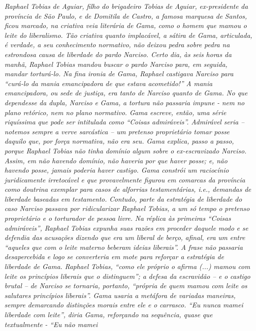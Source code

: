 {\begin{didascalia}
\emph{Raphael Tobias de Aguiar, filho do brigadeiro Tobias de Aguiar,
ex-presidente da província de São Paulo, e de Domitila de Castro, a
famosa marquesa de Santos, ficou marcado, na criativa veia literária de
Gama, como o homem que mamou o leite do liberalismo. Tão criativa quanto
implacável, a sátira de Gama, articulada, é verdade, a seu conhecimento
normativo, não deixou pedra sobre pedra na estrondosa causa de liberdade
do pardo Narciso. Certo dia, às seis horas da manhã, Raphael Tobias
mandou buscar o pardo Narciso para, em seguida, mandar torturá-lo. Na
fina ironia de Gama, Raphael castigava Narciso para ``curá-lo da mania
emancipadora de que estava acometido!'' A mania emancipadora, ou sede de
justiça, era tanto de Narciso quanto de Gama. No que dependesse da
dupla, Narciso e Gama, a tortura não passaria impune - nem no plano
retórico, nem no plano normativo. Gama escreve, então, uma série
riquíssima que pode ser intitulada como ``Coisas admiráveis''. Admirável
seria -- notemos sempre a verve sarcástica -- um pretenso proprietário
tomar posse daquilo que, por força normativa, não era seu. Gama explica,
passo a passo, porque Raphael Tobias não tinha domínio algum sobre o
ex-escravizado Narciso. Assim, em não havendo domínio, não haveria por
que haver posse; e, não havendo posse, jamais poderia haver castigo.
Gama constrói um raciocínio juridicamente irretocável e que
provavelmente figurou em comarcas da província como doutrina exemplar
para casos de alforrias testamentárias, i.e., demandas de liberdade
baseadas em testamento. Contudo, parte da estratégia de liberdade do
caso Narciso passava por ridicularizar Raphael Tobias, a um só tempo o
pretenso proprietário e o torturador de pessoa livre. Na réplica às
primeiras ``Coisas admiráveis'', Raphael Tobias expunha suas razões em
proceder daquele modo e se defendia das acusações dizendo que era um
liberal de berço, afinal, era um entre ``aqueles que com o leite materno
beberam ideias liberais''. A frase não passaria desapercebida e logo se
converteria em mote para reforçar a estratégia de liberdade de Gama.
Raphael Tobias, ``como ele próprio o afirma (...) mamou com leite os
princípios liberais que o distinguem''; a defesa da escravidão -- e o
castigo brutal -- de Narciso se tornaria, portanto, ``própria de quem
mamou com leite os salutares princípios liberais''. Gama usaria a
metáfora de variadas maneiras, sempre demarcando distinções morais entre
ele e o carrasco. ``Eu nunca mamei liberdade com leite'', diria Gama,
reforçando na sequência, quase que textualmente - ``Eu não mamei
}
\end{didascalia}}
